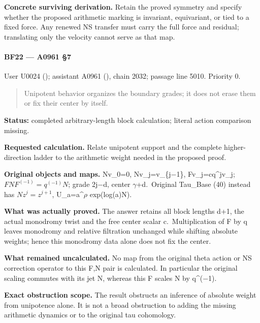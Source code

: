 \textbf{Concrete surviving derivation.} Retain the proved symmetry and
specify whether the proposed arithmetic marking is invariant,
equivariant, or tied to a fixed force. Any renewed NS transfer must
carry the full force and residual; translating only the velocity cannot
serve as that map.

\paragraph{BF22 --- A0961 §7}\label{bf22-a0961-7}

User U0024 (\protect{});
assistant A0961 (\protect{}),
chain 2032; passage line 5010. Priority 0.

\begin{quote}
Unipotent behavior organizes the boundary grades; it does not erase them
or fix their center by itself.
\end{quote}

\textbf{Status:} completed arbitrary-length block calculation; literal
action comparison missing.

\textbf{Requested calculation.} Relate unipotent support and the
complete higher-direction ladder to the arithmetic weight needed in the
proposed proof.

\textbf{Original objects and maps.} Nv\_0=0,
Nv\_j=v\_\{j\allowbreak{}\ensuremath{−}\allowbreak{}1\},
Fv\_j=cq\^{}jv\_j; \(FNF^{(-1)}=q^{(-1)}N\); grade
2j\allowbreak{}\ensuremath{−}\allowbreak{}d, center
\allowbreak{}\ensuremath{γ}\allowbreak{}+d. Original Tau\_Base (40)
instead has \(N z^j=z^{j+1}\),
U\_a=a\textasciicircum{}\allowbreak{}\ensuremath{ρ}\allowbreak{}
exp(log(a)N).

\textbf{What was actually proved.} The answer retains all block lengths
d+1, the actual monodromy twist and the free center scalar
c.~Multiplication of F by q leaves monodromy and relative filtration
unchanged while shifting absolute weights; hence this monodromy data
alone does not fix the center.

\textbf{What remained uncalculated.} No map from the original theta
action or NS correction operator to this F,N pair is calculated. In
particular the original scaling commutes with its jet N, whereas this F
scales N by
q\textasciicircum{}(\allowbreak{}\ensuremath{−}\allowbreak{}1).

\textbf{Exact obstruction scope.} The result obstructs an inference of
absolute weight from unipotence alone. It is not a broad obstruction to
adding the missing arithmetic dynamics or to the original tau
cohomology.

